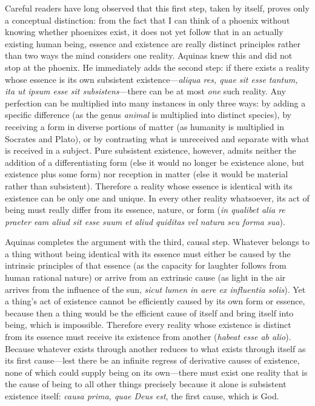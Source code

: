 Careful readers have long observed that this first step, taken by itself, proves only a conceptual distinction: from the fact that I can think of a phoenix without knowing whether phoenixes exist, it does not yet follow that in an actually existing human being, essence and existence are really distinct principles rather than two ways the mind considers one reality. Aquinas knew this and did not stop at the phoenix. He immediately adds the second step: if there exists a reality whose essence is its own subsistent existence---\emph{aliqua res, quae sit esse tantum, ita ut ipsum esse sit subsistens}---there can be at most \emph{one} such reality. Any perfection can be multiplied into many instances in only three ways: by adding a specific difference (as the genus \emph{animal} is multiplied into distinct species), by receiving a form in diverse portions of matter (as humanity is multiplied in Socrates and Plato), or by contrasting what is unreceived and separate with what is received in a subject. Pure subsistent existence, however, admits neither the addition of a differentiating form (else it would no longer be existence alone, but existence plus some form) nor reception in matter (else it would be material rather than subsistent). Therefore a reality whose essence is identical with its existence can be only one and unique. In every other reality whatsoever, its act of being must really differ from its essence, nature, or form (\emph{in qualibet alia re praeter eam aliud sit esse suum et aliud quiditas vel natura seu forma sua}).

Aquinas completes the argument with the third, causal step. Whatever belongs to a thing without being identical with its essence must either be caused by the intrinsic principles of that essence (as the capacity for laughter follows from human rational nature) or arrive from an extrinsic cause (as light in the air arrives from the influence of the sun, \emph{sicut lumen in aere ex influentia solis}). Yet a thing's act of existence cannot be efficiently caused by its own form or essence, because then a thing would be the efficient cause of itself and bring itself into being, which is impossible. Therefore every reality whose existence is distinct from its essence must receive its existence from another (\emph{habeat esse ab alio}). Because whatever exists through another reduces to what exists through itself as its first cause---lest there be an infinite regress of derivative causes of existence, none of which could supply being on its own---there must exist one reality that is the cause of being to all other things precisely because it alone is subsistent existence itself: \emph{causa prima, quae Deus est}, the first cause, which is God.

